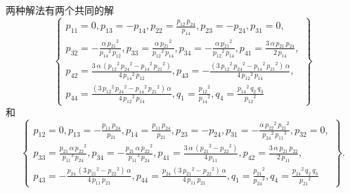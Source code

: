 两种解法有两个共同的解
\begin{equation}
\renewcommand{\arraystretch}{1.2}
\left\{
\begin{array}{l}
{{p}_{11}}=0,
{{p}_{13}}=-{{p}_{14}},
{{p}_{22}}=\frac{{{p}_{12}}\,{{p}_{24}}}{{{p}_{14}}},
{{p}_{23}}=-{{p}_{24}},
{{p}_{31}}=0,\\
{{p}_{32}}=-\frac{\alpha\,{{{p}_{21}}}^{2}}{{{{p}_{14}}}^{2}\,{{p}_{12}}},
{{p}_{33}}=\frac{\alpha\,{{{p}_{21}}}^{2}}{{{{p}_{12}}}^{2}\,{{p}_{14}}},
{{p}_{34}}=-\frac{\alpha\,{{{p}_{21}}}^{2}}{{{{p}_{12}}}^{2}\,{{p}_{14}}},
{{p}_{41}}=\frac{3\,\alpha\,{{p}_{21}}\,{{p}_{24}}}{2\,{{p}_{14}}},\\ 
{{p}_{42}}=\frac{3\,\alpha\,\left( {{{p}_{12}}}^{2}\,{{{p}_{24}}}^{2}-{{{p}_{14}}}^{2}\,{{{p}_{21}}}^{2}\right) }{4\,{{{p}_{14}}}^{2}\,{{p}_{12}}},
{{p}_{43}}=-\frac{\left( 3\,{{{p}_{12}}}^{2}\,{{{p}_{24}}}^{2}-{{{p}_{14}}}^{2}\,{{{p}_{21}}}^{2}\right) \,\alpha}{4\,{{{p}_{12}}}^{2}\,{{p}_{14}}},\\
{{p}_{44}}=\frac{\left( 3\,{{{p}_{12}}}^{2}\,{{{p}_{24}}}^{2}-{{{p}_{14}}}^{2}\,{{{p}_{21}}}^{2}\right) \,\alpha}{4\,{{{p}_{12}}}^{2}\,{{p}_{14}}},
{{q}_{1}}=\frac{{{{p}_{12}}}^{2}}{{{{p}_{14}}}^{2}},
{{q}_{4}}=\frac{{{{p}_{14}}}^{2}\,{{q}_{2}}\,{{q}_{3}}}{{{{p}_{12}}}^{2}}
\end{array}
\right\}
\end{equation}
和
\begin{equation}
\renewcommand{\arraystretch}{1.2}
\left\{
\begin{array}{l}
{{p}_{12}}=0,
{{p}_{13}}=-\frac{{{p}_{11}}\,{{p}_{24}}}{{{p}_{21}}},
{{p}_{14}}=\frac{{{p}_{11}}\,{{p}_{24}}}{{{p}_{21}}},
{{p}_{23}}=-{{p}_{24}},
{{p}_{31}}=-\frac{\alpha\,{{{p}_{22}}}^{2}\,{{{p}_{21}}}^{2}}{{{{p}_{24}}}^{2}\,{{{p}_{11}}}^{3}},
{{p}_{32}}=0,\\ 
{{p}_{33}}=\frac{{{p}_{21}}\,\alpha\,{{{p}_{22}}}^{2}}{{{{p}_{11}}}^{3}\,{{p}_{24}}},
{{p}_{34}}=-\frac{{{p}_{21}}\,\alpha\,{{{p}_{22}}}^{2}}{{{{p}_{11}}}^{3}\,{{p}_{24}}},
{{p}_{41}}=\frac{3\,\alpha\,\left( {{{p}_{21}}}^{2}-{{{p}_{22}}}^{2}\right) }{4\,{{p}_{11}}},
{{p}_{42}}=\frac{3\,\alpha\,{{p}_{21}}\,{{p}_{22}}}{2\,{{p}_{11}}},\\ 
{{p}_{43}}=-\frac{{{p}_{24}}\,\left( 3\,{{{p}_{21}}}^{2}-{{{p}_{22}}}^{2}\right) \,\alpha}{4\,{{p}_{11}}\,{{p}_{21}}},
{{p}_{44}}=\frac{{{p}_{24}}\,\left( 3\,{{{p}_{21}}}^{2}-{{{p}_{22}}}^{2}\right) \,\alpha}{4\,{{p}_{11}}\,{{p}_{21}}},
{{q}_{1}}=\frac{{{{p}_{21}}}^{2}}{{{{p}_{24}}}^{2}},
{{q}_{4}}=\frac{{{{p}_{24}}}^{2}\,{{q}_{2}}\,{{q}_{3}}}{{{{p}_{21}}}^{2}}
\end{array}
\right\} . 
\end{equation}

